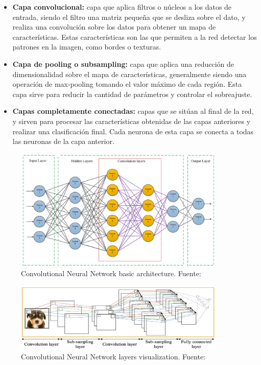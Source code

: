 \documentclass[12pt]{report} %
\begin{document}
\begin{itemize}

    \item \textbf{Capa convolucional:} capa que aplica filtros o núcleos a los datos de entrada, siendo el filtro una matriz pequeña que se desliza sobre el dato, y realiza una convolución sobre los datos para obtener un mapa de características. Estas características son las que permiten a la red detectar los patrones en la imagen, como bordes o texturas.
    \item \textbf{Capa de pooling o subsampling:} capa que aplica una reducción de dimensionalidad sobre el mapa de características, generalmente siendo una operación de max-pooling tomando el valor máximo de cada región. Esta capa sirve para reducir la cantidad de parámetros y controlar el sobreajuste.
    \item \textbf{Capas completamente conectadas:} capas que se sitúan al final de la red, y sirven para procesar las características obtenidas de las capas anteriores y realizar una clasificación final. Cada neurona de esta capa se conecta a todas las neuronas de la capa anterior.

\end{itemize}

\begin{figure}[H]
	\centering
	\includegraphics[width=0.9\textwidth]{cnnStructure.png}
	\caption{Convolutional Neural Network basic architecture. Fuente: \cite{annReview}}
	\label{fig:imagen27}
\end{figure}

\begin{figure}[H]
	\centering
	\includegraphics[width=0.9\textwidth]{basicCnn.png}
	\caption{Convolutional Neural Network layers visualization. Fuente: \cite{deepImages}}
	\label{fig:imagen28}
\end{figure}
\end{document}
